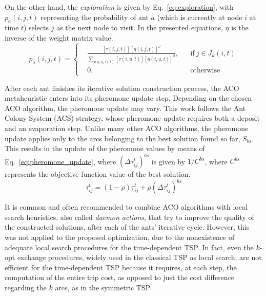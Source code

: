 On the other hand, the \textit{exploration} is given by Eq.~\ref{eq:exploration}, with $p_a(i,j,t)$ representing the probability of ant $a$ (which is currently at node $i$ at time $t$) selects $j$ as the next node to visit.
In the presented equations, $\eta$ is the inverse of the weight matrix value.
\begin{equation}
\label{eq:exploration}
  p_a(i,j,t) =  \left \{
    \begin{aligned}
      & \frac{[\tau(i,j,t)][\eta(i,j,t)]^\beta}{\sum_{u \in J_k(i,t)}[\tau(i,u,t)][\eta(i,u,t)]^\beta}, && \text{if}\ j \in J_k(i,t) \\
      &0, && \text{otherwise}
    \end{aligned} \right. 
\end{equation}


After each ant finishes its iterative solution construction process, the ACO metaheuristic enters into its pheromone update step. Depending on the chosen ACO algorithm, the pheromone update may vary. This work follows the Ant Colony System (ACS) strategy, whose pheromone update requires both a deposit and an evaporation step. Unlike many other ACO algorithms, the pheromone update applies only to the arcs belonging to the best solution found so far, $S_{bs}$. This results in the update of the pheromone values by means of Eq.~\ref{eq:pheromone_update}, where $(\Delta\tau_{ij}^{t})^{bs}$ is given by $1/C^{bs}$, where $C^{bs}$ represents the objective function value of the best solution.
\begin{equation}
\label{eq:pheromone_update}
    \tau_{ij}^{t} = (1-\rho)\tau_{ij}^{t} + \rho (\Delta \tau_{ij}^{t})^{bs}
\end{equation}

It is common and often recommended to combine ACO algorithms with local search heuristics, also called \textit{daemon actions}, that try to improve the quality of the constructed solutions, after each of the ants' iterative cycle. However, this was not applied to the proposed optimization, due to the nonexistence of adequate local search procedures for the time-dependent TSP. In fact, even the $k$-opt exchange procedures, widely used in the classical TSP as local search, are not efficient for the time-dependent TSP because it requires, at each step, the computation of the entire trip cost, as opposed to just the cost difference regarding the $k$ arcs, as in the symmetric TSP.





